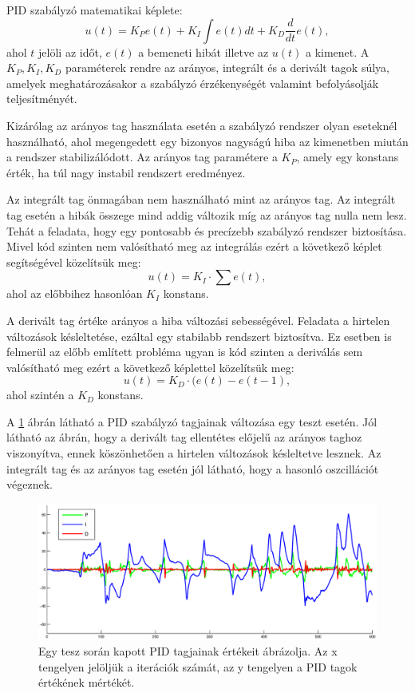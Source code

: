 PID szabályzó matematikai képlete: $$u(t)=K_{P}e(t)+K_{I}\int e(t)dt+K_{D}\frac{d}{dt}e(t),$$ ahol $t$ jelöli az időt, $e(t)$ a bemeneti hibát illetve az $u(t)$ a kimenet. A $K_{P}, K_{I}, K_{D}$ paraméterek rendre az arányos, integrált és a derivált tagok súlya, amelyek meghatározásakor a szabályzó érzékenységét valamint befolyásolják teljesítményét.

Kizárólag az arányos tag használata esetén a szabályzó rendszer olyan eseteknél használható, ahol megengedett egy bizonyos nagyságú hiba az kimenetben miután a rendszer stabilizálódott. Az arányos tag paramétere a $K_{P}$, amely egy konstans érték, ha túl nagy instabil rendszert eredményez.

Az integrált tag önmagában nem használható mint az arányos tag. Az integrált tag esetén a hibák összege mind addig változik míg az arányos tag nulla nem lesz. Tehát a feladata, hogy egy pontosabb és precízebb szabályzó rendszer biztosítása. Mivel kód szinten nem valósítható meg az integrálás ezért a következő képlet segítségével közelítsük meg:$$u(t)=K_{I}\cdot\sum e(t),$$ ahol az előbbihez hasonlóan $K_{I}$ konstans.

A derivált tag értéke arányos a hiba változási sebességével. Feladata a hirtelen változások késleltetése, ezáltal egy stabilabb rendszert biztosítva. Ez esetben is felmerül az előbb említett probléma ugyan is kód szinten a deriválás sem valósítható meg ezért a következő képlettel közelítsük meg:$$u(t)=K_{D}\cdot (e(t) - e(t-1),$$ ahol szintén a $K_{D}$ konstans.

A \ref{pidFig} ábrán látható a PID szabályzó tagjainak változása egy teszt esetén. Jól látható az ábrán, hogy a derivált tag ellentétes előjelű az arányos taghoz viszonyítva, ennek köszönhetően a hirtelen változások késleltetve lesznek. Az integrált tag és az arányos tag esetén jól látható, hogy a hasonló oszcillációt végeznek.

\begin{figure}[h]
	\centering
	\includegraphics[width=1\linewidth]{images/pid.eps}
	\captionsetup{justification=centering,margin=1.5cm}
	\caption[Egy tesz során kapott PID tagjainak értékeit ábrázolja]
	{Egy tesz során kapott PID tagjainak értékeit ábrázolja. Az x tengelyen jelöljük a iterációk számát,	az y tengelyen a PID tagok értékének mértékét.}
	\label{pidFig}
\end{figure}
